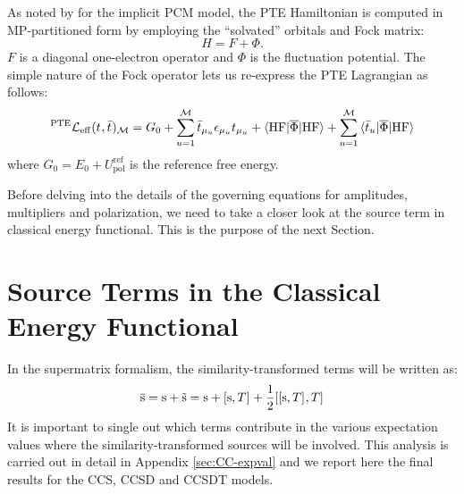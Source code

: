 As noted by \citeauthor{Cammi2009-gu} for the implicit \acrshort{PCM} model,
the \acrshort{PTE} Hamiltonian is computed in \acrshort{MP}-partitioned form by
employing the ``solvated'' orbitals and Fock matrix:
\begin{equation}
  H = F + \Phi.
\end{equation}
$F$ is a diagonal one-electron operator and $\Phi$ is the
fluctuation potential.
The simple nature of the Fock operator lets us re-express the \acrshort{PTE}
Lagrangian as follows:
\begin{equation}
  {}^\mathrm{PTE}\mathcal{L}_\mathrm{eff}(t_{}, \bar{t}_{})_\mathcal{M}
  =
  G_0
  + \sum_{u=1}^{\mathcal{M}}\bar{t}_{\mu_u}\epsilon_{\mu_u}t_{\mu_u}
  + \braket{\mathrm{HF} | \overline{\Phi} | \mathrm{HF}}
  + \sum_{u=1}^{\mathcal{M}}\braket{\bar{t}_{u} | \overline{\Phi} | \mathrm{HF}}
\end{equation}
where $G_0 = E_0 + U_\mathrm{pol}^\mathrm{ref}$ is the reference free
energy.

Before delving into the details of the governing equations for
amplitudes, multipliers and polarization, we need to take a closer look
at the source term in classical energy functional. This is the purpose
of the next Section.

\section{Source Terms in the Classical Energy Functional}
\label{sec:source-terms}

In the supermatrix formalism, the similarity-transformed terms will be
written as:
\begin{equation}
  \overline{\mathrm{s}} = \mathrm{s} + \tilde{\mathrm{s}} = \mathrm{s} +
  [ \mathrm{s}, T ]^{} +
  \frac{1}{2}[ [ \mathrm{s}, T ]^{}, T ]^{}
\end{equation}
It is important to single out which terms contribute in the various
expectation values where the similarity-transformed sources will be
involved.
This analysis is carried out in detail in Appendix \ref{sec:CC-expval}
and we report here the final results for the \gls{CCS}, \gls{CCSD} and
\gls{CCSDT} models.

